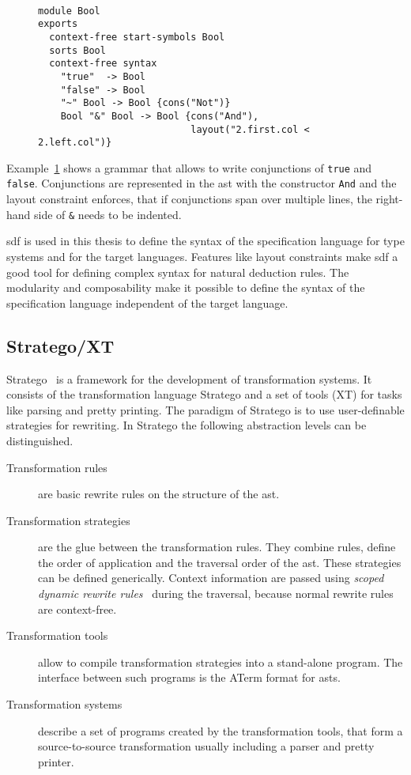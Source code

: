\begin{figure}
\begin{example}{~}
\begin{lstlisting}[language=sdf]
module Bool
exports
  context-free start-symbols Bool
  sorts Bool
  context-free syntax
    "true"  -> Bool
    "false" -> Bool
    "~" Bool -> Bool {cons("Not")}
    Bool "&" Bool -> Bool {cons("And"),
                           layout("2.first.col < 2.left.col")}
\end{lstlisting}
\label{ex:sdf-grammar}
\end{example}
\end{figure}

Example~\ref{ex:sdf-grammar} shows a grammar that allows to write
conjunctions of \verb|true| and \verb|false|. Conjunctions are
represented in the \gls{ast} with the constructor \verb|And| and the
layout constraint enforces, that if conjunctions span over multiple
lines, the right-hand side of \verb|&| needs to be indented.

\gls{sdf} is used in this thesis to define the syntax of the
specification language for type systems and for the target
languages. Features like layout constraints make \gls{sdf} a good tool
for defining complex syntax for natural deduction rules. The
modularity and composability make it possible to define the syntax of
the specification language independent of the target language.
\subsection{Stratego/XT}
Stratego~\cite{Visser01} is a framework for the development of
transformation systems. It consists of the transformation language
Stratego and a set of tools (XT) for tasks like parsing and pretty
printing. The paradigm of Stratego is to use user-definable strategies
for rewriting. In Stratego the following abstraction levels can be
distinguished.

\begin{description}
\item[Transformation rules] are basic rewrite rules on the structure
  of the \gls{ast}.
\item[Transformation strategies] are the glue between the
  transformation rules. They combine rules, define the order of
  application and the traversal order of the \gls{ast}. These
  strategies can be defined generically. Context information are
  passed using \textit{scoped dynamic rewrite
    rules}~\cite{Visser01scopeddynamic} during the traversal, because
  normal rewrite rules are context-free.
\item[Transformation tools] allow to compile transformation strategies
  into a stand-alone program. The interface between such programs is
  the ATerm format for \glspl{ast}.
\item[Transformation systems] describe a set of programs created by
  the transformation tools, that form a source-to-source
  transformation usually including a parser and pretty printer.
\end{description}

